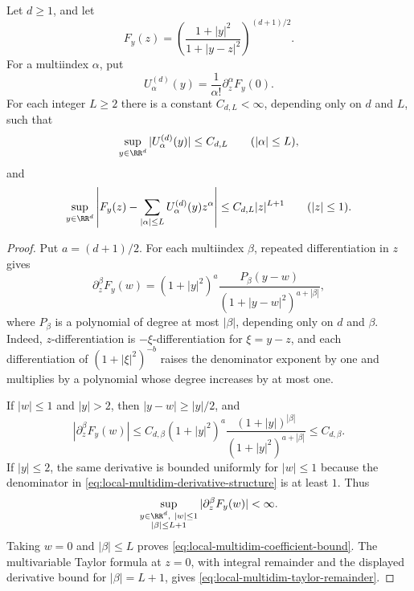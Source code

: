 \begin{lemma}%
\label{lem:local-multidim-quotient-taylor-remainder-core}
Let \(d\ge1\), and let
\[
F_y(z)=\left(\frac{1+|y|^2}{1+|y-z|^2}\right)^{(d+1)/2}.
\]
For a multiindex \(\alpha\), put
\[
U_\alpha^{(d)}(y)=\frac1{\alpha!}\partial_z^\alpha F_y(0).
\]
For each integer \(L\ge2\) there is a constant \(C_{d,L}<\infty\),
depending only on \(d\) and \(L\), such that
\begin{equation}\label{eq:local-multidim-coefficient-bound}
\sup_{y\in\RR^d}|U_\alpha^{(d)}(y)|\le C_{d,L}
\qquad (|\alpha|\le L),
\end{equation}
and
\begin{equation}\label{eq:local-multidim-taylor-remainder}
\sup_{y\in\RR^d}\left|
F_y(z)-\sum_{|\alpha|\le L}U_\alpha^{(d)}(y)z^\alpha
\right|
\le C_{d,L}|z|^{L+1}
\qquad (|z|\le1).
\end{equation}
\end{lemma}

\ifdefined\JFAArticleMain
{}
\else
\begin{proof}
Put \(a=(d+1)/2\).  For each multiindex \(\beta\), repeated
differentiation in \(z\) gives
\begin{equation}\label{eq:local-multidim-derivative-structure}
\partial_z^\beta F_y(w)
=(1+|y|^2)^a
\frac{P_\beta(y-w)}{(1+|y-w|^2)^{a+|\beta|}},
\end{equation}
where \(P_\beta\) is a polynomial of degree at most \(|\beta|\), depending
only on \(d\) and \(\beta\).  Indeed, \(z\)-differentiation is
\(-\xi\)-differentiation for \(\xi=y-z\), and each differentiation of
\((1+|\xi|^2)^{-b}\) raises the denominator exponent by one and multiplies
by a polynomial whose degree increases by at most one.

If \(|w|\le1\) and \(|y|>2\), then \(|y-w|\ge |y|/2\), and
\[
|\partial_z^\beta F_y(w)|
\le C_{d,\beta}
(1+|y|^2)^a
\frac{(1+|y|)^{|\beta|}}{(1+|y|^2)^{a+|\beta|}}
\le C_{d,\beta}.
\]
If \(|y|\le2\), the same derivative is bounded uniformly for \(|w|\le1\)
because the denominator in \eqref{eq:local-multidim-derivative-structure}
is at least \(1\).  Thus
\[
\sup_{\substack{y\in\RR^d,\ |w|\le1\\ |\beta|\le L+1}}
|\partial_z^\beta F_y(w)|<\infty .
\]
Taking \(w=0\) and \(|\beta|\le L\) proves
\eqref{eq:local-multidim-coefficient-bound}.  The multivariable Taylor
formula at \(z=0\), with integral remainder and the displayed derivative
bound for \(|\beta|=L+1\), gives
\eqref{eq:local-multidim-taylor-remainder}.
\end{proof}
\fi


